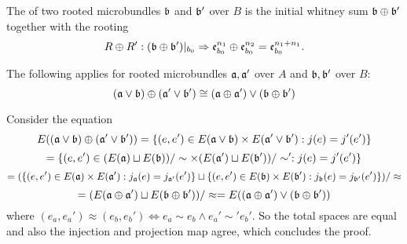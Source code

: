 \begin{mydefinition}
    The  of two rooted microbundles $\bb$ and $\bb'$ over $B$
    is the initial whitney sum $\bb \oplus \bb'$ together with the rooting
    \[ R \oplus R': (\bb \oplus \bb')\restr{b_0} \double \be[n_1]_{b_0} \oplus \be[n_2]_{b_0} = \be[n_1 + n_1]_{b_0}. \]
\end{mydefinition}

\begin{mylemma}\label{suspension::compatability}   
    The following applies for rooted microbundles $\ba, \ba'$ over $A$ and $\bb, \bb'$ over $B$: 
    \[ (\ba \vee \bb) \oplus (\ba' \vee \bb') \cong (\ba \oplus \ba') \vee (\bb \oplus \bb') \]
\end{mylemma}
\begin{myproof}
    Consider the equation
    \[ E((\ba \vee \bb) \oplus (\ba' \vee \bb')) = \set{(e, e') \in E(\ba \vee \bb) \times E(\ba' \vee \bb')}{j(e) = j'(e')} \]
    \[ = \set{(e, e') \in (E(\ba) \sqcup E(\bb)) / \sim \times (E(\ba') \sqcup E(\bb')) / \sim'}{j(e) = j'(e')} \]
    \[ = (\set{(e, e') \in E(\ba) \times E(\ba')}{j_\ba(e) = j_{\ba'}(e')} \sqcup \set{(e, e') \in E(\bb) \times E(\bb')}{j_\bb(e) = j_{\bb'}(e')}) / \approx \]
    \[ = (E(\ba \oplus \ba') \sqcup E(\bb \oplus \bb')) / \approx = E((\ba \oplus \ba') \vee (\bb \oplus \bb'))\]
    where $(e_a, e_a') \approx (e_b, e_b') \iff e_a \sim e_b \land e_a' \sim' e_b'$.
    So the total spaces are equal and also the injection and projection map agree, which concludes the proof.
\end{myproof}